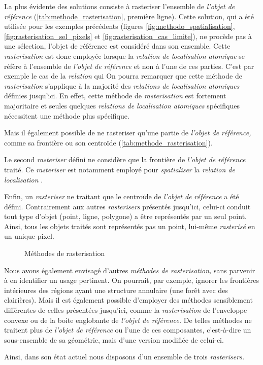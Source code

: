 La plus évidente des solutions consiste à rasteriser l'ensemble de \emph{l'objet de référence} (\autoref{tab:methode_rasterisation}, première ligne). Cette solution, qui a été utilisée pour les exemples précédents (\ie figures \ref{fig:methodo_spatialisation}, \ref{fig:rasterisation_sel_pixels} et \ref{fig:rasterisation_cas_limite}), ne procède pas à une sélection, l'objet de référence est considéré dans son ensemble.
%
Cette \emph{rasterisation} est donc employée lorsque la \emph{relation de localisation atomique} se réfère  à l'ensemble de \emph{l'objet de référence} et non à l'une de ces parties. C'est par exemple le cas de la \emph{relation}  qui
%
On pourra remarquer que cette méthode de \emph{rasterisation} s'applique à la majorité des \emph{relations de localisation atomiques} définies jusqu'ici. En effet, cette méthode de \emph{rasterisation} est fortement majoritaire et seules quelques \emph{relations de localisation atomiques} spécifiques nécessitent une méthode plus spécifique.

Mais il également possible de ne rasteriser qu'une partie de \emph{l'objet de référence,} comme sa frontière ou son centroïde (\autoref{tab:methode_rasterisation}).

Le second \emph{rasteriser} défini ne considère que la frontière de \emph{l'objet de référence} traité.
%
Ce \emph{rasteriser} est notamment employé pour \emph{spatialiser} la \emph{relation de localisation} .

Enfin, un \emph{rasteriser} ne traitant que le centroïde de \emph{l'objet de  référence} a été défini. Contrairement aux autres \emph{rasterisers} présentés jusqu'ici, celui-ci conduit tout type d'objet (\ie point, ligne, polygone) a être représentés par un seul point. Ainsi, tous les objets traités sont représentés pas un point, lui-même \emph{rasterisé} en un unique pixel.

\begin{figure}
  \centering
  
  \caption{Méthodes de rasterisation}
  \label{fig:methode_rasterisation}
\end{figure}

Nous avons également envisagé d'autres \emph{méthodes de rasterisation,} sans parvenir à en identifier un usage pertinent. On pourrait, par exemple, ignorer les frontières intérieures des régions ayant une structure annulaire (\eg une forêt avec des clairières). Mais il est également possible d'employer des méthodes sensiblement différentes de celles présentées jusqu'ici, comme la \emph{rasterisation} de l'enveloppe convexe ou de la boite englobante de \emph{l'objet de référence.} De telles méthodes ne traitent plus de \emph{l'objet de référence} ou l'une de ces composantes, c'est-à-dire un sous-ensemble de sa géométrie, mais d'une version modifiée de celui-ci.

Ainsi, dans son état actuel nous disposons d'un ensemble de trois \emph{rasterisers.}

